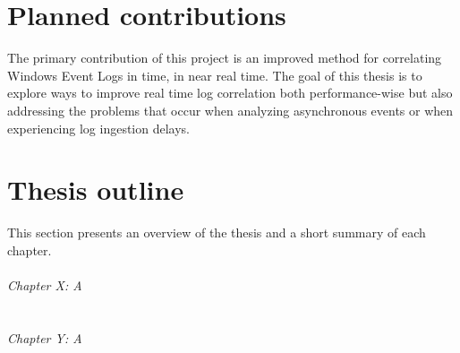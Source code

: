 \section{Planned contributions}
\label{sec:plannedcontributions}

The primary contribution of this project is an improved method for correlating Windows Event Logs in time, in near real time. The goal of this thesis is to explore ways to improve real time log correlation both performance-wise but also addressing the problems that occur when analyzing asynchronous events or when experiencing log ingestion delays.

\section{Thesis outline}
\label{sec:thesisoutline}
This section presents an overview of the thesis and a short summary of each chapter.\\\\
\textit{Chapter X: A}\\
\\\\
\textit{Chapter Y: A}\\
